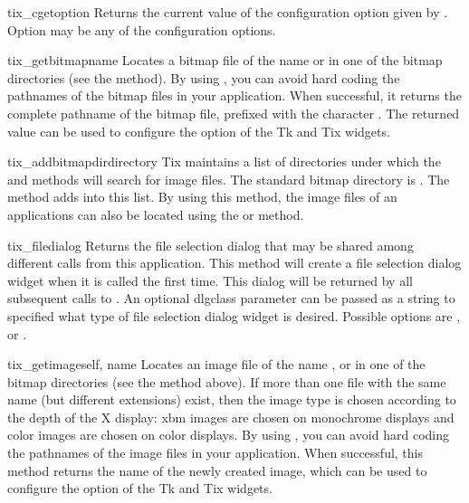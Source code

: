 \begin{methoddesc}{tix_cget}{option}
Returns the current value of the configuration option given by
. Option may be any of the configuration options.
\end{methoddesc}

\begin{methoddesc}{tix_getbitmap}{name}
Locates a bitmap file of the name  or  in
one of the bitmap directories (see the 
method).  By using , you can avoid hard
coding the pathnames of the bitmap files in your application. When
successful, it returns the complete pathname of the bitmap file,
prefixed with the character .  The returned value can be used to
configure the  option of the Tk and Tix widgets.
\end{methoddesc}

\begin{methoddesc}{tix_addbitmapdir}{directory}
Tix maintains a list of directories under which the
 and  methods will
search for image files.  The standard bitmap directory is
. The  method
adds  into this list. By using this method, the image
files of an applications can also be located using the
 or  method.
\end{methoddesc}

\begin{methoddesc}{tix_filedialog}{}
Returns the file selection dialog that may be shared among different
calls from this application.  This method will create a file selection
dialog widget when it is called the first time. This dialog will be
returned by all subsequent calls to .  An
optional dlgclass parameter can be passed as a string to specified
what type of file selection dialog widget is desired.  Possible
options are ,  or
.
\end{methoddesc}


\begin{methoddesc}{tix_getimage}{self, name}
Locates an image file of the name ,  or
 in one of the bitmap directories (see the
 method above). If more than one file with
the same name (but different extensions) exist, then the image type is
chosen according to the depth of the X display: xbm images are chosen
on monochrome displays and color images are chosen on color
displays. By using , you can avoid hard coding
the pathnames of the image files in your application. When successful,
this method returns the name of the newly created image, which can be
used to configure the  option of the Tk and Tix widgets.
\end{methoddesc}

